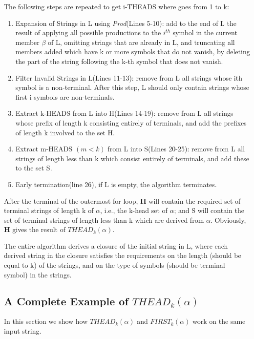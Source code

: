 \documentclass{sig-alternate-05-2015}
\begin{document}
The following steps are repeated to get i-THEADS where goes from 1 to k:
\begin{enumerate}
\item
Expansion of Strings in L using \textit{Prod}(Lines 5-10): add to the end of L the result of applying
all possible productions to the $i^{th}$ symbol in the current
member $\beta$ of L, omitting strings that are already in L, and
truncating all members added which have k or more symbols
that do not vanish, by deleting the part of the string
following the k-th symbol that does not vanish.
\item
Filter Invalid Strings in L(Lines 11-13): remove from L all strings whose ith symbol
is a non-terminal. After this step, L should only contain strings whose first i symbols are non-terminals.
\item
Extract k-HEADS from L into H(Lines 14-19): remove from L all strings whose prefix of
length k consisting entirely of terminals, and add the prefixes
of length k involved to the set H.
\item
Extract m-HEADS $(m<k)$ from L into S(Lines 20-25): remove from L all strings of length less
than k which consist entirely of terminals, and add these to
the set S.
\item
Early termination(line 26), if L is empty, the algorithm terminates. 
\end{enumerate}

After the terminal of the outermost for loop, \textbf{H}
will contain the required set of terminal strings of
length k of $\alpha$, i.e., the k-head set of $\alpha$; and S will contain the
set of terminal strings of length less than k which are derived
from $\alpha$. Obviously, \textbf{H} gives the result of $THEAD_k(\alpha)$.

The entire algorithm derives a closure of the initial
string in L, where each derived string in the closure satisfies
the requirements on the length (should be equal to k) of
the strings, and on the type of symbols (should be terminal
symbol) in the strings.

\subsection{A Complete Example of $THEAD_k(\alpha)$}
In this section we show how $THEAD_k(\alpha)$ and $FIRST_k(\alpha)$
work on the same input string.
\end{document}
